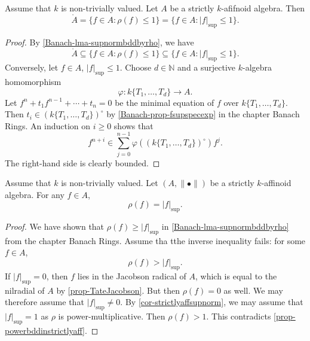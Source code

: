 \begin{proposition}\label{prop-powerbddinstrictlyaff}
    Assume that $k$ is non-trivially valued. Let $A$ be a strictly $k$-afifnoid algebra. Then
    \[
        \mathring{A}=\{f\in A: \rho(f)\leq 1\}=\{f\in A: |f|_{\sup}\leq 1\}.    
    \]
\end{proposition}
\begin{proof}
    By \cref{Banach-lma-supnormbddbyrho}, we have 
    \[
        \mathring{A}\subseteq \{f\in A: \rho(f)\leq 1\}\subseteq \{f\in A: |f|_{\sup}\leq 1\}. 
    \]
    Conversely, let $f\in A$, $|f|_{\sup}\leq 1$. Choose $d\in \mathbb{N}$ and a surjective $k$-algebra homomorphism
    \[
        \varphi:k\{T_1,\ldots,T_d\}\rightarrow A.  
    \]
    Let $f^n+t_1f^{n-1}+\cdots+t_n=0$ be the minimal equation of $f$ over $k\{T_1,\ldots,T_d\}$. Then $t_i\in (k\{T_1,\ldots,T_d\})^{\circ}$ by \cref{Banach-prop-fsupspecexp} in the chapter Banach Rings. An induction on $i\geq 0$ shows that
    \[
        f^{n+i}\in \sum_{j=0}^{n-1}\varphi\left((k\{T_1,\ldots,T_d\})^{\circ} \right)f^j.
    \]
    The right-hand side is clearly bounded.
\end{proof}

\begin{corollary}\label{cor-rhoequsup}
    Assume that $k$ is non-trivially valued.
    Let $(A,\|\bullet\|)$ be a strictly $k$-affinoid algebra. For any $f\in A$,
    \[
        \rho(f)=|f|_{\sup}.  
    \]
\end{corollary}
\begin{proof}
    We have shown that $\rho(f)\geq |f|_{\sup}$ in \cref{Banach-lma-supnormbddbyrho} from the chapter Banach Rings. 
    Assume tha tthe inverse inequality fails: for some $f\in A$,
    \[
        \rho(f)> |f|_{\sup}.
    \]
    If $|f|_{\sup}=0$, then $f$ lies in the Jacobson radical of $A$, which is equal to the nilradial of $A$ by \cref{prop-TateJacobson}. But then $\rho(f)=0$ as well. We may therefore assume that $|f|_{\sup}\neq 0$.
    By \cref{cor-strictlyaffsupnorm}, we may assume that $|f|_{\sup}=1$ as $\rho$ is power-multiplicative. Then $\rho(f)>1$. This contradicts \cref{prop-powerbddinstrictlyaff}.
\end{proof}

